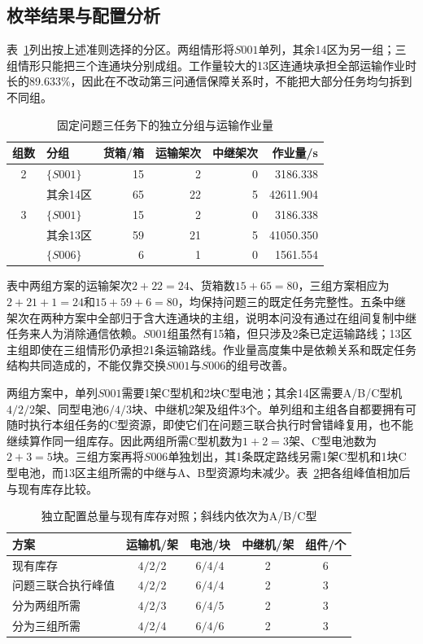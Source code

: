\subsection{枚举结果与配置分析}
表~\ref{tab:q4-partition}列出按上述准则选择的分区。两组情形将$S001$单列，其余14区为另一组；三组情形只能把三个连通块分别成组。工作量较大的13区连通块承担全部运输作业时长的89.633\%，因此在不改动第三问通信保障关系时，不能把大部分任务均匀拆到不同组。
\begin{table}[htbp]
\centering\small
\caption{固定问题三任务下的独立分组与运输作业量}
\label{tab:q4-partition}
\begin{tabular}{@{}clrrrr@{}}
\toprule
组数 & 分组 & 货箱/箱 & 运输架次 & 中继架次 & 作业量/s\\
\midrule
2 & $\{S001\}$ & 15 & 2 & 0 & 3186.338\\
  & 其余14区 & 65 & 22 & 5 & 42611.904\\
\midrule
3 & $\{S001\}$ & 15 & 2 & 0 & 3186.338\\
  & 其余13区 & 59 & 21 & 5 & 41050.350\\
  & $\{S006\}$ & 6 & 1 & 0 & 1561.554\\
\bottomrule
\end{tabular}
\end{table}

表中两组方案的运输架次$2+22=24$、货箱数$15+65=80$，三组方案相应为$2+21+1=24$和$15+59+6=80$，均保持问题三的既定任务完整性。五条中继架次在两种方案中全部归于含大连通块的主组，说明本问没有通过在组间复制中继任务来人为消除通信依赖。$S001$组虽然有15箱，但只涉及2条已定运输路线；13区主组即使在三组情形仍承担21条运输路线。作业量高度集中是依赖关系和既定任务结构共同造成的，不能仅靠交换$S001$与$S006$的组号改善。

两组方案中，单列$S001$需要1架C型机和2块C型电池；其余14区需要A/B/C型机$4/2/2$架、同型电池$6/4/3$块、中继机2架及组件3个。单列组和主组各自都要拥有可随时执行本组任务的C型资源，即使它们在问题三联合执行时曾错峰复用，也不能继续算作同一组库存。因此两组所需C型机数为$1+2=3$架、C型电池数为$2+3=5$块。三组方案再将$S006$单独划出，其1条既定路线另需1架C型机和1块C型电池，而13区主组所需的中继与A、B型资源均未减少。表~\ref{tab:q4-stock}把各组峰值相加后与现有库存比较。
\begin{table}[htbp]
\centering\small
\caption{独立配置总量与现有库存对照；斜线内依次为A/B/C型}
\label{tab:q4-stock}
\begin{tabular}{@{}lcccc@{}}
\toprule
方案 & 运输机/架 & 电池/块 & 中继机/架 & 组件/个\\
\midrule
现有库存 & $4/2/2$ & $6/4/4$ & 2 & 6\\
问题三联合执行峰值 & $4/2/2$ & $6/4/4$ & 2 & 3\\
分为两组所需 & $4/2/3$ & $6/4/5$ & 2 & 3\\
分为三组所需 & $4/2/4$ & $6/4/6$ & 2 & 3\\
\bottomrule
\end{tabular}
\end{table}

